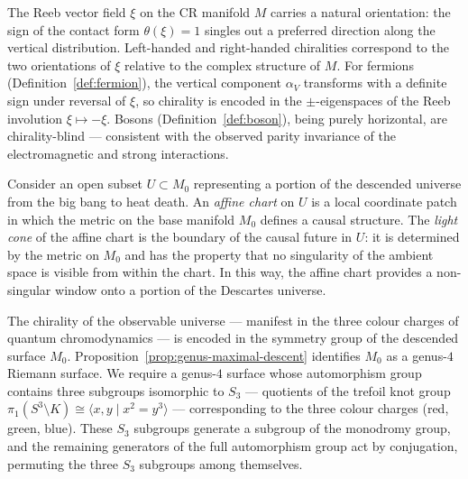 \begin{remark}
\label{rem:descartes-chirality}
The Reeb vector field $\xi$ on the CR manifold $M$ carries a natural
orientation: the sign of the contact form $\theta(\xi) = 1$ singles out a
preferred direction along the vertical distribution.  Left-handed and
right-handed chiralities correspond to the two orientations of $\xi$ relative
to the complex structure of $M$.  For fermions
(Definition~\ref{def:fermion}), the vertical component $\alpha_V$ transforms
with a definite sign under reversal of $\xi$, so chirality is encoded in the
$\pm$-eigenspaces of the Reeb involution $\xi \mapsto -\xi$.  Bosons
(Definition~\ref{def:boson}), being purely horizontal, are chirality-blind ---
consistent with the observed parity invariance of the electromagnetic and
strong interactions.
\end{remark}


\begin{remark}
\label{rem:light-cone-affine}
Consider an open subset $U \subset M_0$ representing a portion of the
descended universe from the big bang to heat death.  An \emph{affine chart}
on $U$ is a local coordinate patch in which the metric on the base manifold
$M_0$ defines a causal structure.  The \emph{light cone} of the affine chart
is the boundary of the causal future in $U$: it is determined by the metric
on $M_0$ and has the property that no singularity of the ambient space is
visible from within the chart.  In this way, the affine chart provides a
non-singular window onto a portion of the Descartes universe.
\end{remark}


\begin{remark}
\label{rem:chirality-trefoil}
The chirality of the observable universe --- manifest in the three colour
charges of quantum chromodynamics --- is encoded in the symmetry group of the
descended surface $M_0$.  Proposition~\ref{prop:genus-maximal-descent}
identifies $M_0$ as a genus-$4$ Riemann surface.  We require a genus-$4$
surface whose automorphism group contains three subgroups isomorphic to $S_3$
--- quotients of the trefoil knot group
$\pi_1(S^3 \setminus K) \cong \langle x, y \mid x^2 = y^3 \rangle$ ---
corresponding to the three colour charges (red, green, blue).  These $S_3$
subgroups generate a subgroup of the monodromy group, and the remaining
generators of the full automorphism group act by conjugation, permuting the
three $S_3$ subgroups among themselves.
\end{remark}


